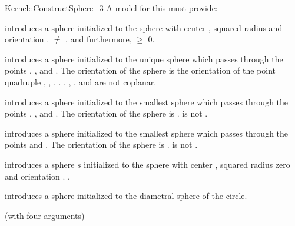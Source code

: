 \begin{ccRefFunctionObjectConcept}{Kernel::ConstructSphere_3}
A model for this must provide:


        {introduces a sphere initialized to the sphere with center ,
        squared radius  and orientation
        .
        \ccPrecond {} $\neq$ , and furthermore,
                    $\geq$ 0.}

        {introduces a sphere initialized to the unique sphere which passes
        through the points , ,  and . The
        orientation of the sphere is the orientation of the point quadruple
        , , , .
        \ccPrecond {}, , , and  are not coplanar.}


      {introduces a sphere initialized to the smallest sphere which passes
      through the points , , and . The orientation of
        the sphere is . \ccPrecond {} is not
        .}

        {introduces a sphere initialized to the smallest sphere which passes
        through the points  and . The orientation of
        the sphere is . \ccPrecond {} is not
        .}


      {introduces a sphere $s$ initialized to the sphere with center 
        , squared radius zero and orientation .
        .
        }

      {introduces a sphere initialized to the diametral sphere of
        the circle.}

\ccRefines
{} (with four arguments)

\ccSeeAlso
{}\\
\end{ccRefFunctionObjectConcept}

